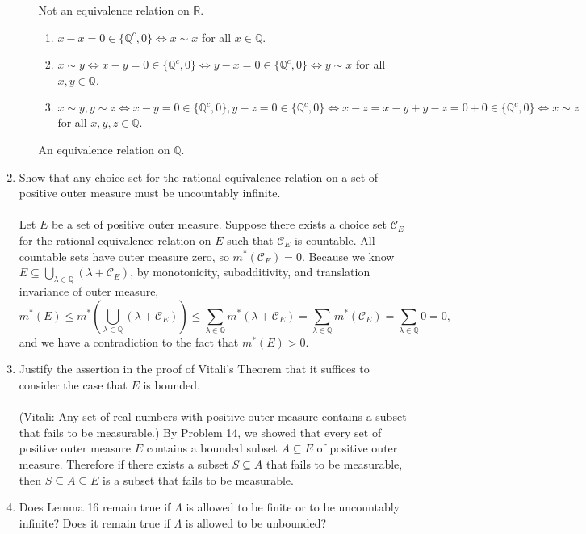 \begin{enumerate}
\begin{enumerate}[label=(\roman*),align=left]
\begin{enumerate}
		\end{enumerate}
		Not an equivalence relation on $\mathbb{R}$.\\
		\begin{enumerate}
			\item $x-x=0\in\{\mathbb{Q}^c,0\}\iff x\sim x$ for all $x\in \mathbb{Q}$.
			\item $x\sim y \iff x-y=0 \in\{\mathbb{Q}^c,0\}\iff y-x=0\in\{\mathbb{Q}^c,0\}\iff y\sim x$ for all $x,y\in \mathbb{Q}$.
			\item $x\sim y,y\sim z \iff x-y=0\in\{\mathbb{Q}^c,0\},y-z=0\in\{\mathbb{Q}^c,0\}\iff x-z=x-y+y-z=0+0\in\{\mathbb{Q}^c,0\}\iff x\sim z$ for all $x,y,z\in \mathbb{Q}$.
		\end{enumerate}
		An equivalence relation on $\mathbb{Q}$.
	\end{enumerate}
	\item Show that any choice set for the rational equivalence relation on a set of positive outer measure must be uncountably infinite.\\
	\\Let $E$ be a set of positive outer measure.
	Suppose there exists a choice set $\mathcal{C}_E$ for the rational equivalence relation on $E$ such that $\mathcal{C}_E$ is countable. 
	All countable sets have outer measure zero, so $m^*(\mathcal{C}_E)=0$.
	Because we know $E\subseteq\bigcup_{\lambda\in\mathbb{Q}}(\lambda+\mathcal{C}_E)$, by monotonicity, subadditivity, and translation invariance of outer measure,
	\[
		m^*(E)\le m^*(\bigcup_{\lambda\in\mathbb{Q}}(\lambda+\mathcal{C}_E))\le\sum_{\lambda\in\mathbb{Q}}m^*(\lambda+\mathcal{C}_E)=\sum_{\lambda\in\mathbb{Q}}m^*(\mathcal{C}_E)=\sum_{\lambda\in\mathbb{Q}}0=0,
	\]
	and we have a contradiction to the fact that $m^*(E)>0$.
	\item Justify the assertion in the proof of Vitali's Theorem that it suffices to consider the case that $E$ is bounded.\\
	\\(Vitali: Any set of real numbers with positive outer measure contains a subset that fails to be measurable.)
	By Problem 14, we showed that every set of positive outer measure $E$ contains a bounded subset $A\subseteq E$ of positive outer measure. Therefore if there exists a subset $S\subseteq A$ that fails to be measurable, then $S \subseteq A\subseteq E$ is a subset that fails to be measurable.
	\item Does Lemma 16 remain true if $\Lambda$ is allowed to be finite or to be uncountably infinite? Does it remain true if $\Lambda$ is allowed to be unbounded?\\

\end{enumerate}
